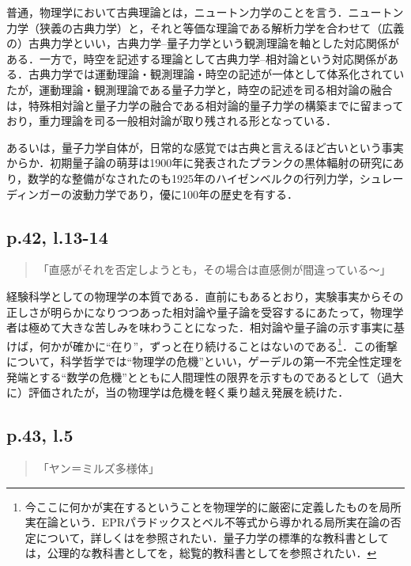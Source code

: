 \documentclass[10pt, a5paper, twoside]{jsarticle}
\theoremstyle{definition}
\begin{document}
			普通，物理学において古典理論とは，ニュートン力学のことを言う．ニュートン力学（狭義の古典力学）と，それと等価な理論である解析力学を合わせて（広義の）古典力学といい，古典力学--量子力学という観測理論を軸とした対応関係がある．一方で，時空を記述する理論として古典力学--相対論という対応関係がある．古典力学では運動理論・観測理論・時空の記述が一体として体系化されていたが，運動理論・観測理論である量子力学と，時空の記述を司る相対論の融合は，特殊相対論と量子力学の融合である相対論的量子力学の構築までに留まっており，重力理論を司る一般相対論が取り残される形となっている．

			あるいは，量子力学自体が，日常的な感覚では古典と言えるほど古いという事実からか．初期量子論の萌芽は1900年に発表されたプランクの黒体輻射の研究にあり，数学的な整備がなされたのも1925年のハイゼンベルクの行列力学，シュレーディンガーの波動力学であり，優に100年の歴史を有する．

		\subsection{p.42, l.13-14}

			\begin{quote}
				
				「直感がそれを否定しようとも，その場合は直感側が間違っている〜」

			\end{quote}

			経験科学としての物理学の本質である．直前にもあるとおり，実験事実からその正しさが明らかになりつつあった相対論や量子論を受容するにあたって，物理学者は極めて大きな苦しみを味わうことになった．相対論や量子論の示す事実に基けば，何かが確かに“在り”，ずっと在り続けることはないのである\footnote{今ここに何かが実在するということを物理学的に厳密に定義したものを局所実在論という．EPRパラドックスとベル不等式から導かれる局所実在論の否定について，詳しくは\cite{ein}を参照されたい．量子力学の標準的な教科書としては，公理的な教科書として\cite{smz}を，総覧的教科書として\cite{igkw}を参照されたい．}．この衝撃について，科学哲学では“物理学の危機”といい\cite{noe}，ゲーデルの第一不完全性定理を発端とする“数学の危機”とともに人間理性の限界を示すものであるとして（過大に）評価されたが，当の物理学は危機を軽く乗り越え発展を続けた．

		\subsection{p.43, l.5}

			\begin{quote}

				「ヤン＝ミルズ多様体」
				
			\end{quote}
\end{document}
